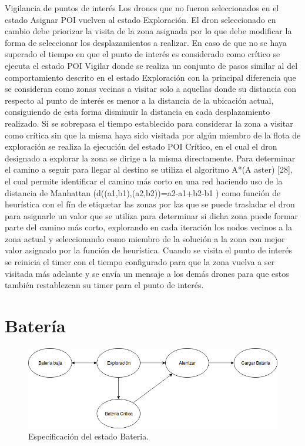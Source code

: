 Vigilancia de puntos de interés
Los drones que no fueron seleccionados en el estado Asignar POI vuelven al estado  Exploración. El dron seleccionado en cambio debe priorizar la visita de la zona asignada por lo que debe modificar la forma de seleccionar los desplazamientos a realizar. En caso de que no se haya superado el tiempo en que el punto de interés es considerado como crítico se ejecuta el estado POI Vigilar donde se realiza un conjunto de pasos similar al del comportamiento descrito en el estado Exploración con la principal diferencia que se consideran como zonas vecinas a visitar solo a aquellas donde su distancia con respecto al punto de interés es menor a la distancia de la ubicación actual, consiguiendo de esta forma disminuir la distancia en cada desplazamiento realizado.
Si se sobrepasa el tiempo establecido para considerar la zona a visitar como crítica sin que la misma haya sido visitada por algún miembro de la flota de exploración se realiza la ejecución del estado POI Crítico, en el cual el dron designado a explorar la zona se dirige a la misma directamente. Para determinar el camino a seguir para llegar al destino se utiliza el algoritmo A*(A aster) [28], el cual permite identificar el camino más corto en una red haciendo uso de la distancia de 
Manhattan (d((a1,b1),(a2,b2))=a2-a1+b2-b1 ) como función de heurística con el fín de etiquetar las zonas por las que se puede trasladar el dron para asignarle un valor que se utiliza para determinar si dicha zona puede formar parte del camino más corto, explorando en cada iteración los nodos vecinos a la zona actual y seleccionando como miembro de la solución a la zona con mejor valor asignado por la función de heurística.
Cuando se visita el punto de interés se reinicia el timer con el tiempo configurado para que la zona vuelva a ser visitada más adelante y se envía un mensaje a los demás drones para que estos también restablezcan su timer para el punto de interés.



\section {Batería}


\begin{figure}[h!]
	\label{fig:comp}
	\includegraphics[width=.8\textwidth]{imagenes/chap5/image5}
	\caption{Especificación del estado Bateria.}
\end{figure}

